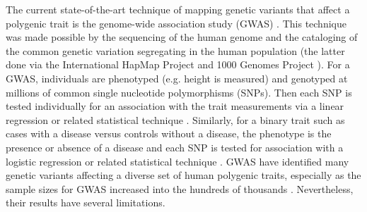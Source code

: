 The current state-of-the-art technique of mapping genetic variants
that affect a polygenic trait is the genome-wide association study
(GWAS) \citep{Hirschhorn2005}. This technique was made possible by the sequencing of the
human genome \citep{Lander2001, Venter2001, HGP2004, Lander2011} and the cataloging of the common genetic variation
segregating in the human population (the latter done via the
International HapMap Project \citep{HapMap2005, HapMap2007, HapMap2010} and 1000 Genomes Project \citep{1KG2010, 1KG2012}). For a GWAS, individuals are phenotyped
(e.g. height is measured) and genotyped at millions of common single
nucleotide polymorphisms (SNPs).  Then each SNP is tested individually
for an association with the trait measurements via a linear regression
or related statistical technique \citep{Balding2006, Stephens2009, Yang2014}. Similarly, for a binary trait such
as cases with a disease versus controls without a disease, the
phenotype is the presence or absence of a disease and each SNP is
tested for association with a logistic regression or related
statistical technique \citep{Chang2015}. GWAS have identified many genetic variants
affecting a diverse set of human polygenic traits, especially as the
sample sizes for GWAS increased into the hundreds of
thousands \citep{Welter2014}. Nevertheless, their results have several limitations.

